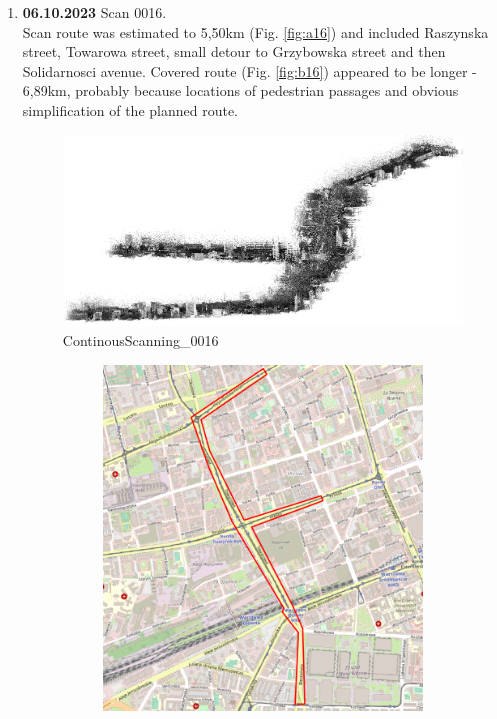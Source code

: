 \documentclass[a4paper,12pt]{book}
\begin{document}
\begin{enumerate}
	\item \textbf{06.10.2023} Scan 0016. \\
	Scan route was estimated to 5,50km (Fig. \ref{fig:a16}) and included Raszynska street, Towarowa street, small detour to Grzybowska street and then Solidarnosci avenue. Covered route (Fig. \ref{fig:b16}) appeared to be longer - 6,89km, probably because locations of pedestrian passages and obvious simplification of the planned route. 
	\begin{figure}[H]
		\includegraphics[width=1\linewidth]{cloud16}
		\caption{ContinousScanning\_0016}
	\end{figure}
	\begin{figure}[H]
		\centering
		\begin{subfigure}{.63\textwidth}
			\centering
			\includegraphics[width=1\linewidth]{route_p16}

\end{subfigure}
\end{figure}
\end{enumerate}
\end{document}
